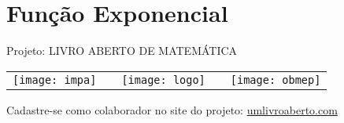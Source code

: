 \ifnum{}
\renewcommand\chapterillustration{./abertura-exponencial}
\else
\renewcommand\chapterillustration{./abertura-exponencial-professor}
\fi
\renewcommand\chapterwhat{Crescimento e decaimento exponenciais, função exponencial, juros compostos, progressão geométrica, expoentes racionais e irracionais.}
\renewcommand\chapterbecause{Dizemos que estamos diante de um crescimento exponencial sempre que o aumento percentual de determinada quantidade por unidade de tempo é constante. Este é o caso das medições econômicas, financeiras e políticas de crescimento - de vendas, lucros, preços de ações, produto interno bruto, inflação, taxas de juros. Assim, compreender bem o crescimento exponencial é crucial para compreender o mundo.}
\chapter{Função Exponencial}



\mbox{}\thispagestyle{empty}\clearpage

\thispagestyle{empty}

\begin{center}
Projeto: LIVRO ABERTO DE MATEMÁTICA

 \begin{tabular}{lcccr}
\texttt{[image: impa]}& \quad\quad& \texttt{[image: logo]} & \quad\quad& \texttt{[image: obmep]} 
\end{tabular}
\end{center}

\vspace*{.3cm}

Cadastre-se como colaborador no site do projeto: \url{umlivroaberto.com}




